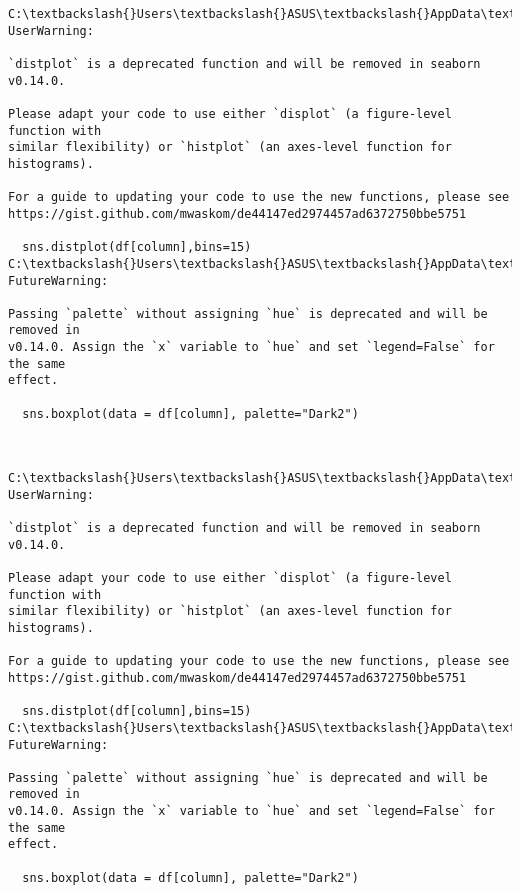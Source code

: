 \documentclass[11pt]{article}
\begin{document}
    \begin{Verbatim}[commandchars=\\\{\}]
C:\textbackslash{}Users\textbackslash{}ASUS\textbackslash{}AppData\textbackslash{}Local\textbackslash{}Temp\textbackslash{}ipykernel\_1856\textbackslash{}3792330012.py:5: UserWarning:

`distplot` is a deprecated function and will be removed in seaborn v0.14.0.

Please adapt your code to use either `displot` (a figure-level function with
similar flexibility) or `histplot` (an axes-level function for histograms).

For a guide to updating your code to use the new functions, please see
https://gist.github.com/mwaskom/de44147ed2974457ad6372750bbe5751

  sns.distplot(df[column],bins=15)
C:\textbackslash{}Users\textbackslash{}ASUS\textbackslash{}AppData\textbackslash{}Local\textbackslash{}Temp\textbackslash{}ipykernel\_1856\textbackslash{}3792330012.py:8: FutureWarning:

Passing `palette` without assigning `hue` is deprecated and will be removed in
v0.14.0. Assign the `x` variable to `hue` and set `legend=False` for the same
effect.

  sns.boxplot(data = df[column], palette="Dark2")
    \end{Verbatim}

    \begin{center}
    \end{center}
    { \hspace*{\fill} \\}
    
    \begin{Verbatim}[commandchars=\\\{\}]
C:\textbackslash{}Users\textbackslash{}ASUS\textbackslash{}AppData\textbackslash{}Local\textbackslash{}Temp\textbackslash{}ipykernel\_1856\textbackslash{}3792330012.py:5: UserWarning:

`distplot` is a deprecated function and will be removed in seaborn v0.14.0.

Please adapt your code to use either `displot` (a figure-level function with
similar flexibility) or `histplot` (an axes-level function for histograms).

For a guide to updating your code to use the new functions, please see
https://gist.github.com/mwaskom/de44147ed2974457ad6372750bbe5751

  sns.distplot(df[column],bins=15)
C:\textbackslash{}Users\textbackslash{}ASUS\textbackslash{}AppData\textbackslash{}Local\textbackslash{}Temp\textbackslash{}ipykernel\_1856\textbackslash{}3792330012.py:8: FutureWarning:

Passing `palette` without assigning `hue` is deprecated and will be removed in
v0.14.0. Assign the `x` variable to `hue` and set `legend=False` for the same
effect.

  sns.boxplot(data = df[column], palette="Dark2")
    \end{Verbatim}
\end{document}
